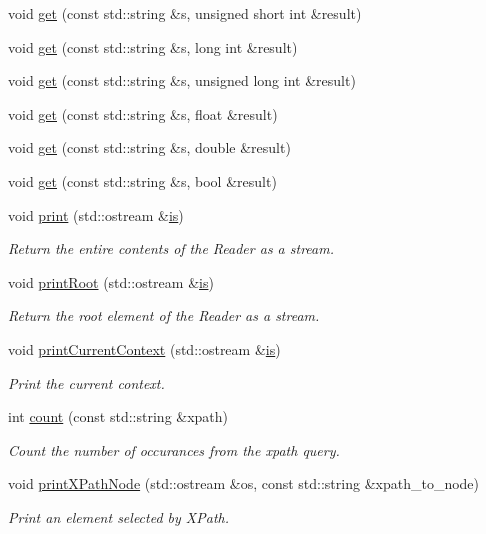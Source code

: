 \begin{DoxyCompactItemize}
void \mbox{\hyperlink{classADATXML_1_1XMLReader_ac7b357f5d7f8b71ad0cd98c37283e2f8}{get}} (const std\+::string \&s, unsigned short int \&result)
\item 
void \mbox{\hyperlink{classADATXML_1_1XMLReader_a6b20ab012a431d51ee5bfd7b40eee3fb}{get}} (const std\+::string \&s, long int \&result)
\item 
void \mbox{\hyperlink{classADATXML_1_1XMLReader_ad9e43f867d48ac2b39291e2af9ec6b4a}{get}} (const std\+::string \&s, unsigned long int \&result)
\item 
void \mbox{\hyperlink{classADATXML_1_1XMLReader_a5b96d00a5503d62acd8cfbb296e6b586}{get}} (const std\+::string \&s, float \&result)
\item 
void \mbox{\hyperlink{classADATXML_1_1XMLReader_ac5f530295603b483a1b63f3b0c6e7eba}{get}} (const std\+::string \&s, double \&result)
\item 
void \mbox{\hyperlink{classADATXML_1_1XMLReader_ae3ba71a241315a5e90ba745fdc7e045b}{get}} (const std\+::string \&s, bool \&result)
\item 
void \mbox{\hyperlink{classADATXML_1_1XMLReader_a72513fe6f299e02428bdf4d225163f50}{print}} (std\+::ostream \&\mbox{\hyperlink{x_8cc_a81abbbdef81e25584a2eab888e643d3d}{is}})
\begin{DoxyCompactList}\small\item\em Return the entire contents of the Reader as a stream. \end{DoxyCompactList}\item 
void \mbox{\hyperlink{classADATXML_1_1XMLReader_a732a08c1605f8c01663105bb3586b575}{print\+Root}} (std\+::ostream \&\mbox{\hyperlink{x_8cc_a81abbbdef81e25584a2eab888e643d3d}{is}})
\begin{DoxyCompactList}\small\item\em Return the root element of the Reader as a stream. \end{DoxyCompactList}\item 
void \mbox{\hyperlink{classADATXML_1_1XMLReader_a424f9e30746b4fdc106b57b5ce95f7ec}{print\+Current\+Context}} (std\+::ostream \&\mbox{\hyperlink{x_8cc_a81abbbdef81e25584a2eab888e643d3d}{is}})
\begin{DoxyCompactList}\small\item\em Print the current context. \end{DoxyCompactList}\item 
int \mbox{\hyperlink{classADATXML_1_1XMLReader_a59584913f1338d956de60adef16a0718}{count}} (const std\+::string \&xpath)
\begin{DoxyCompactList}\small\item\em Count the number of occurances from the xpath query. \end{DoxyCompactList}\item 
void \mbox{\hyperlink{classADATXML_1_1XMLReader_ae1bbeacb282c3e9b33750d36aea11d32}{print\+X\+Path\+Node}} (std\+::ostream \&os, const std\+::string \&xpath\+\_\+to\+\_\+node)
\begin{DoxyCompactList}\small\item\em Print an element selected by X\+Path. \end{DoxyCompactList}\end{DoxyCompactItemize}
